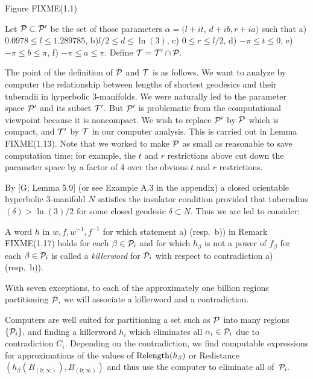  \centerline{Figure FIXME(1.1)}

 \hglue-8pt Let ${\cal P}\subset{\cal P}^{\prime}$ be the set of those parameters $\alpha
= (l+it$, $d+ib, r+ia)$ such
that
 a)       $0.0978\le l \le 1.289785$,
 b)\enspace      $l/2 \le d\le \ln(3)$,
 c) \enspace   $0\le r \le l/2$,
 d) \enspace      $-\pi \le t \le 0$,
 e) \enspace	$-\pi \le b \le \pi$,
 f) \enspace	$-\pi \le a \le \pi$.
\noindent 
Define ${\cal T}={\cal T}^{\prime}\cap {\cal P}.$
\enddemo

The point of the definition of ${\cal P}$ and ${\cal T}$ is as follows.  We want to analyze by computer the relationship between lengths of shortest geodesics  and their tuberadii in hyperbolic $3$-manifolds.  We were naturally led to the parameter space 
${\cal P}^{\prime}$ and its subset ${\cal T}^{\prime}.$  But 
${\cal P}^{\prime}$ is problematic from the computational viewpoint because it is noncompact.  We wish to replace 
${\cal P}^{\prime}$ by ${\cal P}$ which is compact, and 
${\cal T}^{\prime}$ by ${\cal T}$ in our computer analysis.  This is carried out in Lemma FIXME(1.13).  Note that we worked to make ${\cal P}$ as small as reasonable to save computation time;  for example, the $t$ and $r$ restrictions above cut down the parameter space by a factor of 4 over the obvious $t$ and $r$ restrictions. 

By [G; Lemma 5.9] (or see Example A.3 in the appendix) a closed orientable hyperbolic $3$-manifold $N$
satisfies the insulator condition provided that
tuberadius$(\delta) > \ln(3)/2$ for some closed geodesic $\delta\subset N.$  Thus we
are led to consider:

  A word $h$ in $w,f,w^{-1},f^{-1}$ for which statement a) (resp.\ b)) in Remark FIXME(1.17) holds for each $\beta\in {\cal P}_i$
and for which $h_\beta$ is not a power of $f_\beta$ for each $\beta\in {\cal P}_i$ is
called a {\it killerword} for ${\cal P}_i$ with respect to contradiction a) (resp.\ b)).

  With seven exceptions,  to each of the approximately one
billion regions partitioning ${\cal P},$ we will
associate a killerword and a contradiction.  \enddemo 

  Computers are well suited for partitioning a set such as ${\cal P}$
into many regions $\{{\cal P}_i \},$ and finding a
killerword $h_i$ which eliminates all $\alpha_i \in {\cal P}_i $ due to contradiction $C_i.$
Depending on the contradiction, we find
computable expressions  for approximations of the values of
${\rm Relength}(h_\beta)$ or Redistance$(h_\beta(B_{(0;\infty)}), B_{(0;\infty)})$ and
thus use the computer to eliminate all of~${\cal P}_i .$ 
\enddemo

